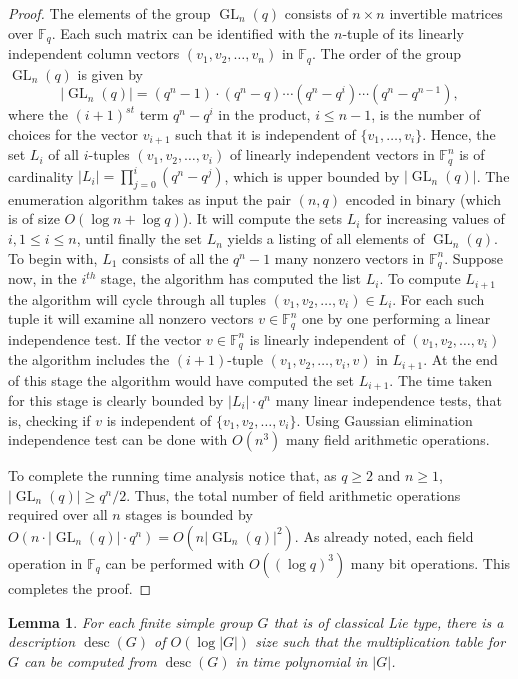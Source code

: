 \documentclass{elsarticle}
\newtheorem{lemma}[theorem]{Lemma}
\newcommand{\desc}{\mathop{\mathrm{desc}}}
\newcommand{\GL}{\mathop{\mathrm{GL}}\nolimits}
\newcommand{\F}{\mathbb{F}}
\begin{document}
\begin{proof}
  The elements of the group $\GL_n(q)$ consists of $n\times n$
  invertible matrices over $\F_q$. Each such matrix can be identified
  with the $n$-tuple of its linearly independent column vectors
  $(v_1,v_2,\ldots,v_n)$ in $\F_q$. The order of the group $\GL_n(q)$
  is given by
  \[
    |\GL_n(q)| = (q^n-1)\cdot (q^n-q)\cdots (q^n-q^i)\cdots (q^n-q^{n-1}),
  \]
  where the $(i+1)^{st}$ term $q^n-q^i$ in the product, $i\le n-1$, is
  the number of choices for the vector $v_{i+1}$ such that it is
  independent of $\{v_1,\ldots,v_i\}$. Hence, the set $L_i$ of all
  $i$-tuples $(v_1,v_2,\ldots,v_i)$ of linearly independent vectors in
  $\F_q^n$ is of cardinality $|L_i|=\prod_{j=0}^i(q^n-q^j)$, which is
  upper bounded by $|\GL_n(q)|$. The enumeration algorithm takes as
  input the pair $(n,q)$ encoded in binary (which is of size $O(\log
  n+\log q)$). It will compute the sets $L_i$ for increasing values of
  $i, 1\le i\le n$, until finally the set $L_n$ yields a listing of
  all elements of $\GL_n(q)$. To begin with, $L_1$ consists of all the
  $q^n-1$ many nonzero vectors in $\F_q^n$. Suppose now, in the
  $i^{th}$ stage, the algorithm has computed the list $L_i$. To
  compute $L_{i+1}$ the algorithm will cycle through all tuples
  $(v_1,v_2,\ldots,v_i)\in L_i$. For each such tuple it will examine
  all nonzero vectors $v\in \F_q^n$ one by one performing a linear
  independence test. If the vector $v\in \F_q^n$ is linearly
  independent of $(v_1,v_2,\ldots,v_i)$ the algorithm includes the
  $(i+1)$-tuple $(v_1,v_2,\ldots,v_i,v)$ in $L_{i+1}$. At the end of
  this stage the algorithm would have computed the set $L_{i+1}$. The
  time taken for this stage is clearly bounded by $|L_i|\cdot q^n$
  many linear independence tests, that is, checking if $v$ is
  independent of $\{v_1,v_2,\ldots,v_i\}$. Using Gaussian elimination
  \cite[Section 3.3]{schrijver-book} independence test can be done
  with $O(n^3)$ many field arithmetic operations.

  To complete the running time analysis notice that, as $q\ge 2$ and
  $n\ge 1$, $|\GL_n(q)|\ge q^n/2$. Thus, the total number of field
  arithmetic operations required over all $n$ stages is bounded by
  $O(n\cdot |\GL_n(q)|\cdot q^n)=O(n|\GL_n(q)|^2)$. As already noted,
  each field operation in $\F_q$ can be performed with $O((\log q)^3)$
  many bit operations. This completes the proof.
\end{proof}

\begin{lemma}\label{classical}
  For each finite simple group $G$ that is of classical Lie type, there
  is a description $\desc(G)$ of $O(\log |G|)$ size such that the
  multiplication table for $G$ can be computed from $\desc(G)$
  in time polynomial in $|G|$.
\end{lemma}
\end{document}
